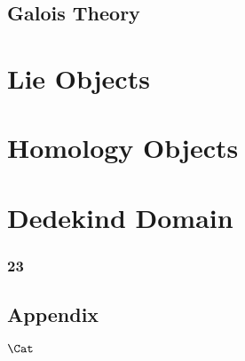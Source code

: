 \chapter{Galois Theory}

\part{Lie Objects}

\part{Homology Objects}



\part{Dedekind Domain}
\section{23}


\begin{appendices}
\part{Appendix}
%
\end{appendices}

$\Cat$

\newpage
\backmatter

\printglossaries

\newpage
{}
\printindex

\newpage
{}




